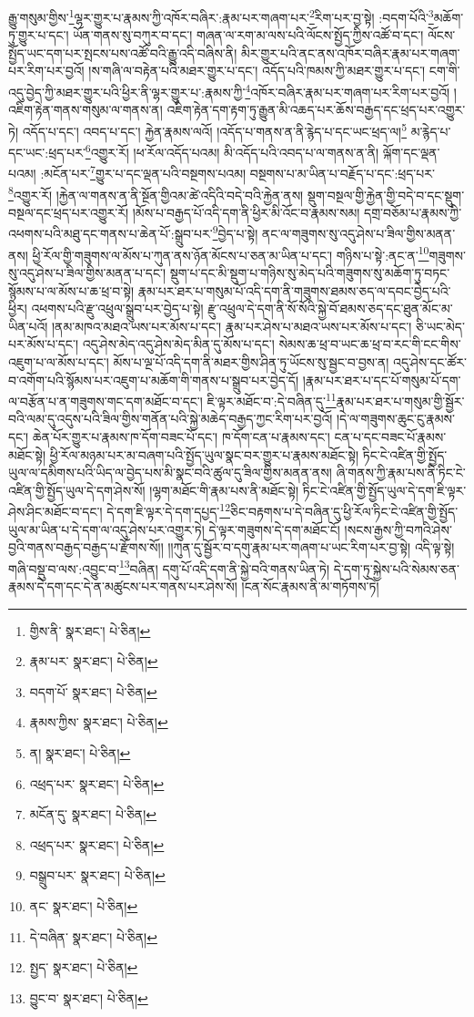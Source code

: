རྒྱུ་གསུམ་གྱིས་\footnote{གྱིས་ནི་  སྣར་ཐང་།  པེ་ཅིན། }ལྷར་གྱུར་པ་རྣམས་ཀྱི་འཁོར་བཞིར་:རྣམ་པར་གཞག་པར་\footnote{རྣམ་པར་  སྣར་ཐང་།  པེ་ཅིན། }རིག་པར་བྱ་སྟེ། :བདག་པོའི་\footnote{བདག་པོ་  སྣར་ཐང་།  པེ་ཅིན། }མཆོག་ཏུ་གྱུར་པ་དང་། ཡོན་གནས་སུ་བཀུར་བ་དང་། གཞན་ལ་རག་མ་ལས་པའི་ལོངས་སྤྱོད་ཀྱིས་འཚོ་བ་དང་། ལོངས་སྤྱོད་ཡང་དག་པར་སྤངས་པས་འཚོ་བའི་རྒྱུ་འདི་བཞིས་ནི། མིར་གྱུར་པའི་ནང་ནས་འཁོར་བཞིར་རྣམ་པར་གཞག་པར་རིག་པར་བྱའོ། །ས་གཞི་ལ་བརྟེན་པའི་མཐར་གྱུར་པ་དང་། འདོད་པའི་ཁམས་ཀྱི་མཐར་གྱུར་པ་དང་། ངག་གི་འདུ་བྱེད་ཀྱི་མཐར་གྱུར་པའི་ཕྱིར་ནི་ལྷར་གྱུར་པ་:རྣམས་ཀྱི་\footnote{རྣམས་ཀྱིས་  སྣར་ཐང་།  པེ་ཅིན། }འཁོར་བཞིར་རྣམ་པར་གཞག་པར་རིག་པར་བྱའོ། །འཇིག་རྟེན་གནས་གསུམ་ལ་གནས་ན། འཇིག་རྟེན་དག་རྟག་ཏུ་རྒྱུན་མི་འཆད་པར་ཆོས་བརྒྱད་དང་ཕྲད་པར་འགྱུར་ཏེ། འདོད་པ་དང་། འབད་པ་དང་། རྐྱེན་རྣམས་ལའོ། །འདོད་པ་གནས་ན་ནི་རྙེད་པ་དང་ཡང་ཕྲད་ལ།\footnote{ན།  སྣར་ཐང་།  པེ་ཅིན། } མ་རྙེད་པ་དང་ཡང་:ཕྲད་པར་\footnote{འཕྲད་པར་  སྣར་ཐང་།  པེ་ཅིན། }འགྱུར་རོ། །ཕ་རོལ་འདོད་པའམ། མི་འདོད་པའི་འབད་པ་ལ་གནས་ན་ནི། ལྐོག་དང་ལྡན་པའམ། :མངོན་པར་\footnote{མངོན་དུ་  སྣར་ཐང་།  པེ་ཅིན། }གྱུར་པ་དང་ལྡན་པའི་བསྔགས་པའམ། བསྔགས་པ་མ་ཡིན་པ་བརྗོད་པ་དང་:ཕྲད་པར་\footnote{འཕྲད་པར་  སྣར་ཐང་།  པེ་ཅིན། }འགྱུར་རོ། །རྐྱེན་ལ་གནས་ན་ནི་སྔོན་གྱིའམ་ཚེ་འདིའི་བདེ་བའི་རྐྱེན་ནས། སྡུག་བསྔལ་གྱི་རྐྱེན་གྱི་བདེ་བ་དང་སྡུག་བསྔལ་དང་ཕྲད་པར་འགྱུར་རོ། །མོས་པ་བརྒྱད་པོ་འདི་དག་ནི་ཕྱིར་མི་འོང་བ་རྣམས་སམ། དགྲ་བཅོམ་པ་རྣམས་ཀྱི་འཕགས་པའི་མཐུ་དང་གནས་པ་ཆེན་པོ་:སྒྲུབ་པར་\footnote{བསྒྲུབ་པར་  སྣར་ཐང་།  པེ་ཅིན། }བྱེད་པ་སྟེ། ནང་ལ་གཟུགས་སུ་འདུ་ཤེས་པ་ཟིལ་གྱིས་མནན་ནས། ཕྱི་རོལ་གྱི་གཟུགས་ལ་མོས་པ་ཀུན་ནས་ཉོན་མོངས་པ་ཅན་མ་ཡིན་པ་དང་། གཉིས་པ་སྟེ་:ནང་ན་\footnote{ནང་  སྣར་ཐང་།  པེ་ཅིན། }གཟུགས་སུ་འདུ་ཤེས་པ་ཟིལ་གྱིས་མནན་པ་དང་། སྡུག་པ་དང་མི་སྡུག་པ་གཉིས་སུ་མེད་པའི་གཟུགས་སུ་མཆོག་ཏུ་བཏང་སྙོམས་པ་ལ་མོས་པ་ཆ་ཕྲ་བ་སྟེ། རྣམ་པར་ཐར་པ་གསུམ་པོ་འདི་དག་ནི་གཟུགས་ཐམས་ཅད་ལ་དབང་བྱེད་པའི་ཕྱིར། འཕགས་པའི་རྫུ་འཕྲུལ་སྒྲུབ་པར་བྱེད་པ་སྟེ། རྫུ་འཕྲུལ་དེ་དག་ནི་སོ་སོའི་སྐྱེ་བོ་ཐམས་ཅད་དང་ཐུན་མོང་མ་ཡིན་པའོ། །ནམ་མཁའ་མཐའ་ཡས་པར་མོས་པ་དང་། རྣམ་པར་ཤེས་པ་མཐའ་ཡས་པར་མོས་པ་དང་། ཅི་ཡང་མེད་པར་མོས་པ་དང་། འདུ་ཤེས་མེད་འདུ་ཤེས་མེད་མིན་དུ་མོས་པ་དང་། སེམས་ཆ་ཕྲ་བ་ཡང་ཆ་ཕྲ་བ་རང་གི་ངང་གིས་འཇུག་པ་ལ་མོས་པ་དང་། མོས་པ་ལྔ་པོ་འདི་དག་ནི་མཐར་གྱིས་ཤིན་ཏུ་ཡོངས་སུ་སྦྱང་བ་བྱས་ན། འདུ་ཤེས་དང་ཚོར་བ་འགོག་པའི་སྙོམས་པར་འཇུག་པ་མཆོག་གི་གནས་པ་སྒྲུབ་པར་བྱེད་དོ། །རྣམ་པར་ཐར་པ་དང་པོ་གསུམ་པོ་དག་ལ་བརྩོན་པ་ན་གཟུགས་གང་དག་མཐོང་བ་དང་། ཇི་ལྟར་མཐོང་བ་:དེ་བཞིན་དུ་\footnote{དེ་བཞིན་  སྣར་ཐང་།  པེ་ཅིན། }རྣམ་པར་ཐར་པ་གསུམ་གྱི་སྦྱོར་བའི་ལམ་དུ་འདུས་པའི་ཟིལ་གྱིས་གནོན་པའི་སྐྱེ་མཆེད་བརྒྱད་ཀྱང་རིག་པར་བྱའོ། །དེ་ལ་གཟུགས་ཆུང་ངུ་རྣམས་དང་། ཆེན་པོར་གྱུར་པ་རྣམས་ཁ་དོག་བཟང་པོ་དང་། ཁ་དོག་ངན་པ་རྣམས་དང་། ངན་པ་དང་བཟང་པོ་རྣམས་མཐོང་སྟེ། ཕྱི་རོལ་མཉམ་པར་མ་བཞག་པའི་སྤྱོད་ཡུལ་སྣང་བར་གྱུར་པ་རྣམས་མཐོང་སྟེ། ཏིང་ངེ་འཛིན་གྱི་སྤྱོད་ཡུལ་ལ་དམིགས་པའི་ཡིད་ལ་བྱེད་པས་མི་སྣང་བའི་ཚུལ་དུ་ཟིལ་གྱིས་མནན་ནས། ཞི་གནས་ཀྱི་རྣམ་པས་ནི་ཏིང་ངེ་འཛིན་གྱི་སྤྱོད་ཡུལ་དེ་དག་ཤེས་སོ། །ལྷག་མཐོང་གི་རྣམ་པས་ནི་མཐོང་སྟེ། ཏིང་ངེ་འཛིན་གྱི་སྤྱོད་ཡུལ་དེ་དག་ཇི་ལྟར་ཤེས་ཤིང་མཐོང་བ་དང་། དེ་དག་ཇི་ལྟར་དེ་དག་དཔྱད་\footnote{སྤྱད་  སྣར་ཐང་།  པེ་ཅིན། }ཅིང་བརྟགས་པ་དེ་བཞིན་དུ་ཕྱི་རོལ་ཏིང་ངེ་འཛིན་གྱི་སྤྱོད་ཡུལ་མ་ཡིན་པ་དེ་དག་ལ་འདུ་ཤེས་པར་འགྱུར་ཏེ། དེ་ལྟར་གཟུགས་དེ་དག་མཐོང་ངོ། །སངས་རྒྱས་ཀྱི་བཀའི་ཤེས་བྱའི་གནས་བརྒྱད་བརྒྱད་པ་རྫོགས་སོ།། །།ཀུན་དུ་སྦྱོར་བ་དགུ་རྣམ་པར་གཞག་པ་ཡང་རིག་པར་བྱ་སྟེ། འདི་ལྟ་སྟེ། གཞི་བསྡུ་བ་ལས་:འབྱུང་བ་\footnote{བྱུང་བ་  སྣར་ཐང་།  པེ་ཅིན། }བཞིན། དགུ་པོ་འདི་དག་ནི་སྐྱེ་བའི་གནས་ཡིན་ཏེ། དེ་དག་ཏུ་སྐྱེས་པའི་སེམས་ཅན་རྣམས་དེ་དག་དང་དེ་ན་མཚུངས་པར་གནས་པར་ཤེས་སོ། །ངན་སོང་རྣམས་ནི་མ་གཏོགས་ཏེ། 